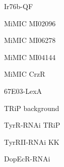 \documentclass[17pt]{extarticle}
\begin{document}
\footnotesize
\newpage\vspace*{-0.15cm}
\begin{large}
Ir76b-QF \\[0.5em]
\end{large}
\footnotesize
\newpage\vspace*{-0.15cm}
\begin{normalsize}
Mi{MIC} MI02096 \\[0.5em]
\end{normalsize}
\footnotesize
\newpage\vspace*{-0.15cm}
\begin{normalsize}
Mi{MIC} MI06278 \\[0.5em]
\end{normalsize}
\footnotesize
\newpage\vspace*{-0.15cm}
\begin{normalsize}
Mi{MIC} MI04144 \\[0.5em]
\end{normalsize}
\footnotesize
\newpage\vspace*{-0.15cm}
\begin{normalsize}
Mi{MIC} CrzR \\[0.5em]
\end{normalsize}
\footnotesize
\newpage\vspace*{-0.15cm}
\begin{large}
67E03-LexA \\[0.5em]
\end{large}
\footnotesize
\newpage\vspace*{-0.15cm}
\begin{normalsize}
TRiP background \\[0.5em]
\end{normalsize}
\footnotesize
\newpage\vspace*{-0.15cm}
\begin{normalsize}
TyrR-RNAi TRiP \\[0.5em]
\end{normalsize}
\footnotesize
\newpage\vspace*{-0.15cm}
\begin{normalsize}
TyrRII-RNAi KK \\[0.5em]
\end{normalsize}
\footnotesize
\newpage\vspace*{-0.15cm}
\begin{normalsize}
DopEcR-RNAi \\[0.5em]
\end{normalsize}
\footnotesize
\newpage\vspace*{-0.15cm}
\end{document}
